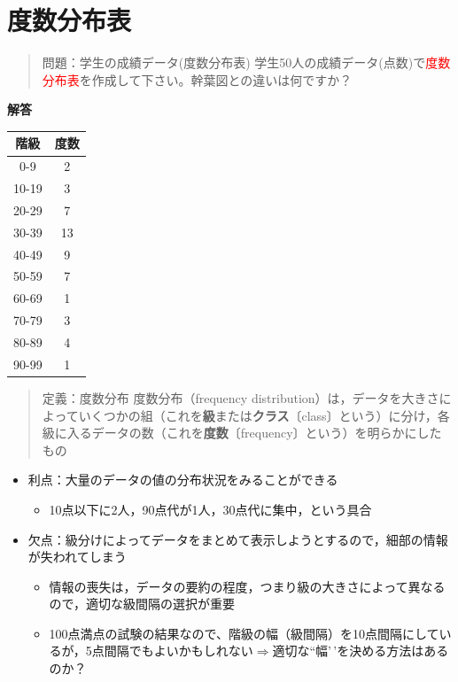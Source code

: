 \documentclass[
]{book}
\providecommand{\tightlist}{%
  \setlength{\itemsep}{0pt}\setlength{\parskip}{0pt}}
\theoremstyle{definition}
\theoremstyle{definition}
\theoremstyle{definition}
\theoremstyle{definition}
\theoremstyle{remark}
\begin{document}
\hypertarget{ux5ea6ux6570ux5206ux5e03ux8868}{%
\section{度数分布表}\label{ux5ea6ux6570ux5206ux5e03ux8868}}

\begin{quote}
問題：学生の成績データ(度数分布表)
学生50人の成績データ(点数)で\textcolor{red}{度数分布表}を作成して下さい。幹葉図との違いは何ですか？
\end{quote}

\textbf{解答}

\begin{longtable}[]{@{}cc@{}}
\toprule()
階級 & 度数 \\
\midrule()
\endhead
0-9 & 2 \\
10-19 & 3 \\
20-29 & 7 \\
30-39 & 13 \\
40-49 & 9 \\
50-59 & 7 \\
60-69 & 1 \\
70-79 & 3 \\
80-89 & 4 \\
90-99 & 1 \\
\bottomrule()
\end{longtable}

\begin{quote}
定義：度数分布
度数分布（frequency distribution）は，データを大きさによっていくつかの組（これを\textbf{級}または\textbf{クラス}〔class〕という）に分け，各級に入るデータの数（これを\textbf{度数}〔frequency〕という）を明らかにしたもの
\end{quote}

\begin{itemize}
\tightlist
\item
  利点：大量のデータの値の分布状況をみることができる

  \begin{itemize}
  \tightlist
  \item
    10点以下に2人，90点代が1人，30点代に集中，という具合
  \end{itemize}
\item
  欠点：級分けによってデータをまとめて表示しようとするので，細部の情報が失われてしまう

  \begin{itemize}
  \tightlist
  \item
    情報の喪失は，データの要約の程度，つまり級の大きさによって異なるので，適切な級間隔の選択が重要
  \item
    100点満点の試験の結果なので、階級の幅（級間隔）を10点間隔にしているが，5点間隔でもよいかもしれない\(\Rightarrow\)適切な``幅'\,'を決める方法はあるのか？
  \end{itemize}
\end{itemize}
\end{document}
